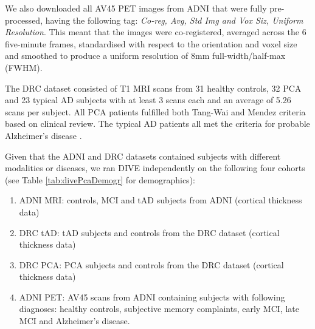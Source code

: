 We also downloaded all AV45 PET images from ADNI that were fully pre-processed, having the following tag: \emph{Co-reg, Avg, Std Img and Vox Siz, Uniform Resolution}. This meant that the images were co-registered, averaged across the 6 five-minute frames, standardised with respect to the orientation and voxel size and smoothed to produce a uniform resolution of 8mm full-width/half-max (FWHM). 

The DRC dataset consisted of T1 MRI scans from 31 healthy controls, 32 PCA and 23 typical AD subjects with at least 3 scans each and an average of 5.26 scans per subject. All PCA patients fulfilled both Tang-Wai \cite{tang2004clinical} and Mendez \cite{mendez2002posterior} criteria based on clinical review. The typical AD patients all met the criteria for probable Alzheimer's disease \cite{dubois2007research,dubois2010revising}. 

Given that the ADNI and DRC datasets contained subjects with different modalities or diseases, we ran DIVE independently on the following four cohorts (see Table \ref{tab:divePcaDemogr} for demographics): 
\begin{enumerate}
 \item ADNI MRI: controls, MCI and tAD subjects from ADNI (cortical thickness data) 
 \item DRC tAD: tAD subjects and controls from the DRC dataset (cortical thickness data)
 \item DRC PCA: PCA subjects and controls from the DRC dataset (cortical thickness data)
 \item ADNI PET: AV45 scans from ADNI containing subjects with following diagnoses: healthy controls, subjective memory complaints, early MCI, late MCI and Alzheimer's disease.
\end{enumerate}


